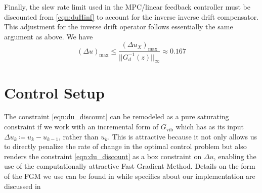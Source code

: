 \documentclass[twocolumn,twoside]{IEEEtran}
\newcommand{\Gv}{\ensuremath{G_{\text{vib}}}\xspace}
\begin{document}
Finally, the slew rate limit used in the MPC/linear feedback controller must be discounted from \eqref{eqn:duHinf} to account for the inverse inverse drift compensator. This adjustment for the inverse drift operator follows essentially the same argument as above. We have
\begin{equation}
  (\Delta u)_{\text{max}} \leq \frac{(\Delta u_X)_{\text{max}}}{||G^{-1}_d(z)||_{\infty}} \approx 0.167 \label{eqn:du_discount}
\end{equation}
\section{Control Setup}\label{sec:control_setup}
The constraint \eqref{eqn:du_discount} can be remodeled as a pure saturating constraint if we work with an incremental form of \(\Gv\) which has as its input \({\Delta u_k\coloneqq u_k-u_{k-1}}\), rather than \(u_k\). This is attractive because it not only allows us to directly penalize the rate of change in the optimal control problem but also renders the constraint \eqref{eqn:du_discount} as a box constraint on $\Delta u$, enabling the use of the computationally attractive Fast Gradient Method. Details on the form of the FGM we use can be found in \cite{Jerez_Trans_2014, jerez_embedded_2013} while specifics about our implementation are discussed in \cite{braker_application_2017}
\end{document}
